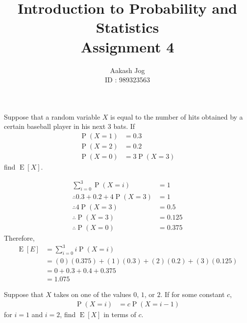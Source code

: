 \documentclass[fleqn, a4paper, 11pt, oneside]{amsart}
\title
[
	Introduction to Probability and Statistics : Assignment 4
]
{
	Introduction to Probability and Statistics\\
	Assignment 4
}
\author
{
	Aakash Jog\\
	ID : 989323563
}
\date{\formatdate{30}{3}{2016}}
\theoremstyle{definition}
\theoremstyle{theorem}
\DeclareMathOperator{\prob}{\mathrm{P}}
\DeclareMathOperator{\expct}{\mathrm{E}}
\begin{document}
\maketitle

\begin{question}
	Suppose that a random variable $X$ is equal to the number of hits obtained by a certain baseball player in his next $3$ bats.
	If
	\begin{align*}
		\prob(X = 1) & = 0.3 \\
		\prob(X = 2) & = 0.2 \\
		\prob(X = 0) & = 3 \prob(X = 3)
	\end{align*}
	find $\expct[X]$.
\end{question}

\begin{solution}
	\begin{align*}
		\sum\limits_{i = 0}^{3} \prob(X = i)  & = 1     \\
		\therefore 0.3 + 0.2 + 4 \prob(X = 3) & = 1     \\
		\therefore 4 \prob(X = 3)             & = 0.5   \\
		\therefore \prob(X = 3)               & = 0.125 \\
		\therefore \prob(X = 0)               & = 0.375
	\end{align*}
	Therefore,
	\begin{align*}
		\expct[E] & = \sum\limits_{i = 0}^{3} i \prob(X = i)            \\
                          & = (0) (0.375) + (1) (0.3) + (2) (0.2) + (3) (0.125) \\
                          & = 0 + 0.3 + 0.4 + 0.375                             \\
                          & = 1.075
	\end{align*}
\end{solution}

\begin{question}
	Suppose that $X$ takes on one of the values $0$, $1$, or $2$.
	If for some constant $c$,
	\begin{align*}
		\prob(X = i) & = c \prob(X = i - 1)
	\end{align*}
	for $i = 1$ and $i = 2$, find $\expct[X]$ in terms of $c$.
\end{question}
\end{document}
